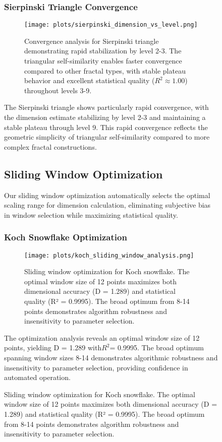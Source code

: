 \documentclass[preprint,12pt]{elsarticle}
\begin{document}
\begin{figure}[ht]
\subsubsection{Sierpinski Triangle Convergence}

\begin{figure}[ht]
\centering
\texttt{[image: plots/sierpinski\_dimension\_vs\_level.png]}
\caption{Convergence analysis for Sierpinski triangle demonstrating rapid stabilization by level 2-3. The triangular self-similarity enables faster convergence compared to other fractal types, with stable plateau behavior and excellent statistical quality ($R^2 \approx 1.00$) throughout levels 3-9.}
\label{fig:sierpinski_convergence}
\end{figure}

The Sierpinski triangle shows particularly rapid convergence, with the dimension estimate stabilizing by level 2-3 and maintaining a stable plateau through level 9. This rapid convergence reflects the geometric simplicity of triangular self-similarity compared to more complex fractal constructions.

\subsection{Sliding Window Optimization}

Our sliding window optimization automatically selects the optimal scaling range for dimension calculation, eliminating subjective bias in window selection while maximizing statistical quality.

\subsubsection{Koch Snowflake Optimization}

\begin{figure}[ht]
\centering
\texttt{[image: plots/koch\_sliding\_window\_analysis.png]}
\caption{Sliding window optimization for Koch snowflake. The optimal window size of 12 points maximizes both dimensional accuracy (D = 1.289) and statistical quality (R² = 0.9995). The broad optimum from 8-14 points demonstrates algorithm robustness and insensitivity to parameter selection.}
\label{fig:koch_optimization}
\end{figure}

The optimization analysis reveals an optimal window size of 12 points, yielding D = 1.289 with$R^2$= 0.9995. The broad optimum spanning window sizes 8-14 demonstrates algorithmic robustness and insensitivity to parameter selection, providing confidence in automated operation.


\end{figure}
\end{document}
